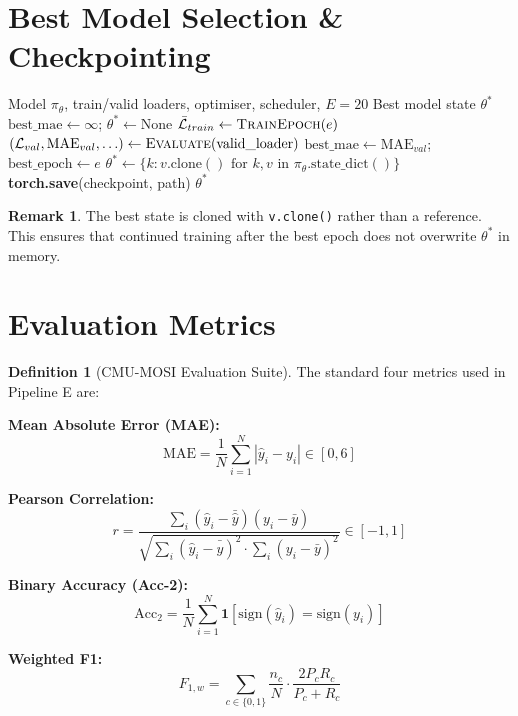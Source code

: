 \documentclass[12pt,a4paper]{article}
\theoremstyle{definition}
\newtheorem{definition}[theorem]{Definition}
\newtheorem{remark}[theorem]{Remark}
\begin{document}
\section{Best Model Selection \& Checkpointing}

\begin{algorithm}[H]
\caption{\textsc{FullTrainingLoop} — 20 Epochs with Best-Model Tracking}
\label{alg:training_loop}
\begin{algorithmic}[1]
\Require Model $\pi_\theta$, train/valid loaders, optimiser, scheduler, $E=20$
\Ensure Best model state $\theta^*$
\State $\text{best\_mae} \gets \infty$; $\theta^* \gets \text{None}$
  \State $\bar{\mathcal{L}}_{train} \gets \textsc{TrainEpoch}(e)$
  \State $(\mathcal{L}_{val}, \text{MAE}_{val}, \ldots) \gets \textsc{Evaluate}(\text{valid\_loader})$
    \State $\text{best\_mae} \gets \text{MAE}_{val}$; $\text{best\_epoch} \gets e$
    \State $\theta^* \gets \{k: v.\text{clone}() \text{ for } k,v \text{ in } \pi_\theta.\text{state\_dict}()\}$
  \EndIf
  \State \textbf{torch.save}(checkpoint, path) 
\EndFor
\State \Return $\theta^*$ 
\end{algorithmic}
\end{algorithm}

\begin{remark}
The best state is cloned with \texttt{v.clone()} rather than a reference. This ensures that continued training after the best epoch does not overwrite $\theta^*$ in memory.
\end{remark}

\section{Evaluation Metrics}

\begin{definition}[CMU-MOSI Evaluation Suite]
The standard four metrics used in Pipeline E are:

\textbf{Mean Absolute Error (MAE):}
$$\text{MAE} = \frac{1}{N}\sum_{i=1}^{N}|\hat{y}_i - y_i| \in [0, 6]$$

\textbf{Pearson Correlation:}
$$r = \frac{\sum_i (\hat{y}_i - \bar{\hat{y}})(y_i - \bar{y})}{\sqrt{\sum_i (\hat{y}_i - \bar{\hat{y}})^2 \cdot \sum_i (y_i - \bar{y})^2}} \in [-1, 1]$$

\textbf{Binary Accuracy (Acc-2):}
$$\text{Acc}_2 = \frac{1}{N}\sum_{i=1}^N \mathbf{1}[\text{sign}(\hat{y}_i) = \text{sign}(y_i)]$$

\textbf{Weighted F1:}
$$F_{1,w} = \sum_{c \in \{0,1\}} \frac{n_c}{N} \cdot \frac{2 P_c R_c}{P_c + R_c}$$
\end{definition}
\end{document}
